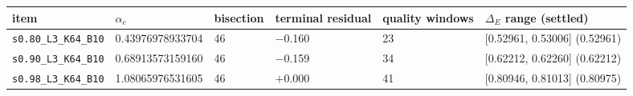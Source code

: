 \begin{tabular}{llllll}
\toprule
item & $\alpha_c$ & bisection & terminal residual & quality windows & $\Delta_E$ range (settled) \\
\midrule
\texttt{s0.80\_L3\_K64\_B10} & 0.43976978933704 & 46 & $-$0.160 & 23 & [0.52961, 0.53006] (0.52961)\\
\texttt{s0.90\_L3\_K64\_B10} & 0.68913573159160 & 46 & $-$0.159 & 34 & [0.62212, 0.62260] (0.62212)\\
\texttt{s0.98\_L3\_K64\_B10} & 1.08065976531605 & 46 & $+$0.000 & 41 & [0.80946, 0.81013] (0.80975)\\
\bottomrule
\end{tabular}
